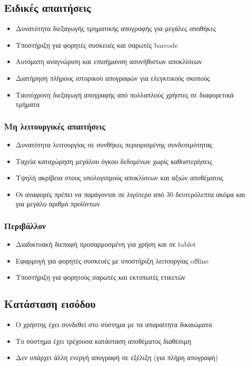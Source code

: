 \documentclass[12pt,a4paper,twoside]{book}
\begin{document}
\subsection{Ειδικές απαιτήσεις} %
\begin{itemize}
  \item Δυνατότητα διεξαγωγής τμηματικής απογραφής για μεγάλες αποθήκες %
  \item Υποστήριξη για φορητές συσκευές και σαρωτές barcode
  \item Αυτόματη αναγνώριση και επισήμανση ασυνήθιστων αποκλίσεων
  \item Διατήρηση πλήρους ιστορικού απογραφών για ελεγκτικούς σκοπούς
  \item Ταυτόχρονη διεξαγωγή απογραφής από πολλαπλούς χρήστες σε διαφορετικά τμήματα %
\end{itemize}

\subsubsection{Μη λειτουργικές απαιτήσεις}
\begin{itemize}
  \item Δυνατότητα λειτουργίας σε συνθήκες περιορισμένης συνδεσιμότητας %
  \item Ταχεία καταχώρηση μεγάλου όγκου δεδομένων χωρίς καθυστερήσεις %
  \item Υψηλή ακρίβεια στους υπολογισμούς αποκλίσεων και αξιών αποθέματος
  \item Οι αναφορές πρέπει να παράγονται σε λιγότερο από 30 δευτερόλεπτα ακόμα και για μεγάλο αριθμό προϊόντων %
\end{itemize}

\subsubsection{Περιβάλλον}
\begin{itemize}
  \item Διαδικτυακή διεπαφή προσαρμοσμένη για χρήση και σε tablet %
  \item Εφαρμογή για φορητές συσκευές με υποστήριξη λειτουργίας offline
  \item Υποστήριξη για φορητούς σαρωτές και εκτυπωτές ετικετών
\end{itemize}

\subsection{Κατάσταση εισόδου} %
\begin{itemize}
  \item Ο χρήστης έχει συνδεθεί στο σύστημα με τα απαραίτητα δικαιώματα %
  \item Το σύστημα έχει τρέχουσα κατάσταση αποθέματος διαθέσιμη %
  \item Δεν υπάρχει άλλη ενεργή απογραφή σε εξέλιξη (για πλήρη απογραφή)
\end{itemize}
\end{document}
